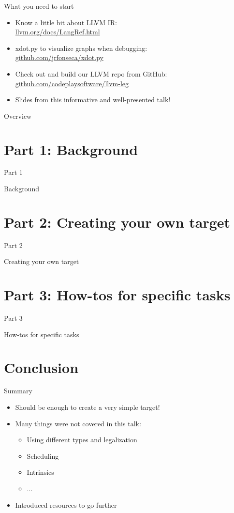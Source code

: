 \documentclass[t]{beamer}
\newcommand{\talkpart}[2]{%
\section{Part #1: #2}

\begin{frame}[c]{Part #1}

\vspace{1cm}
\centerline{\LARGE{#2}}

\end{frame}}
\begin{document}

\begin{frame}{What you need to start}

\begin{itemize}
    \item Know a little bit about LLVM IR: \\ \url{llvm.org/docs/LangRef.html}
    \item xdot.py to visualize graphs when debugging: \\ \url{github.com/jrfonseca/xdot.py}
    \item Check out and build our LLVM repo from GitHub: \\ \url{github.com/codeplaysoftware/llvm-leg}
    \item Slides from this informative and well-presented talk!
\end{itemize}

\end{frame}


\begin{frame}{Overview}
\tableofcontents
\end{frame}


\talkpart{1}{Background}


\talkpart{2}{Creating your own target}


\talkpart{3}{How-tos for specific tasks}



\section*{Conclusion}

\begin{frame}{Summary}

\begin{itemize}
    \item Should be enough to create a very simple target!
    \item Many things were not covered in this talk:
    \begin{itemize}
        \item Using different types and legalization
        \item Scheduling
        \item Intrinsics
        \item ...
    \end{itemize}
    \item Introduced resources to go further
\end{itemize}

\end{frame}
\end{document}

